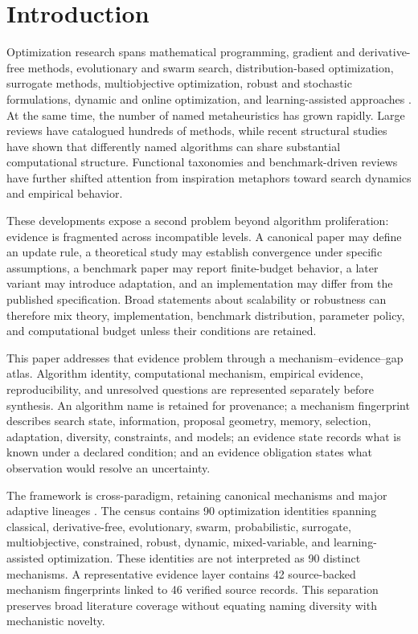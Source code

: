 \section{Introduction}
\label{sec:introduction}

Optimization research spans mathematical programming, gradient and derivative-free methods, evolutionary and swarm search, distribution-based optimization, surrogate methods, multiobjective optimization, robust and stochastic formulations, dynamic and online optimization, and learning-assisted approaches \cite{nelder1965simplex,storn1997de,hansen2001cma,kennedy1995pso,deb2002nsga2,zhang2007moead}. At the same time, the number of named metaheuristics has grown rapidly. Large reviews have catalogued hundreds of methods, while recent structural studies have shown that differently named algorithms can share substantial computational structure. Functional taxonomies and benchmark-driven reviews have further shifted attention from inspiration metaphors toward search dynamics and empirical behavior.

These developments expose a second problem beyond algorithm proliferation: evidence is fragmented across incompatible levels. A canonical paper may define an update rule, a theoretical study may establish convergence under specific assumptions, a benchmark paper may report finite-budget behavior, a later variant may introduce adaptation, and an implementation may differ from the published specification. Broad statements about scalability or robustness can therefore mix theory, implementation, benchmark distribution, parameter policy, and computational budget unless their conditions are retained.

This paper addresses that evidence problem through a mechanism--evidence--gap atlas. Algorithm identity, computational mechanism, empirical evidence, reproducibility, and unresolved questions are represented separately before synthesis. An algorithm name is retained for provenance; a mechanism fingerprint describes search state, information, proposal geometry, memory, selection, adaptation, diversity, constraints, and models; an evidence state records what is known under a declared condition; and an evidence obligation states what observation would resolve an uncertainty.

The framework is cross-paradigm, retaining canonical mechanisms and major adaptive lineages \cite{zhang2009jade,tanabe2013shade,tanabe2014lshade,brester2006jde,qin2009sade}. The census contains 90 optimization identities spanning classical, derivative-free, evolutionary, swarm, probabilistic, surrogate, multiobjective, constrained, robust, dynamic, mixed-variable, and learning-assisted optimization. These identities are not interpreted as 90 distinct mechanisms. A representative evidence layer contains 42 source-backed mechanism fingerprints linked to 46 verified source records. This separation preserves broad literature coverage without equating naming diversity with mechanistic novelty.

